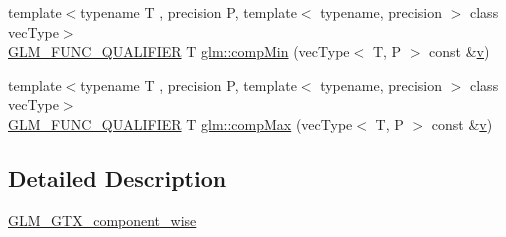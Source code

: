 \begin{DoxyCompactItemize}
\item 
{\footnotesize template$<$typename T , precision P, template$<$ typename, precision $>$ class vec\+Type$>$ }\\\mbox{\hyperlink{setup_8hpp_a33fdea6f91c5f834105f7415e2a64407}{G\+L\+M\+\_\+\+F\+U\+N\+C\+\_\+\+Q\+U\+A\+L\+I\+F\+I\+ER}} T \mbox{\hyperlink{namespaceglm_a1577bdcf5f8b76fb66296ac53fe77fa8}{glm\+::comp\+Min}} (vec\+Type$<$ T, P $>$ const \&\mbox{\hyperlink{glad_8h_a14cfbe2fc2234f5504618905b69d1e06}{v}})
\item 
{\footnotesize template$<$typename T , precision P, template$<$ typename, precision $>$ class vec\+Type$>$ }\\\mbox{\hyperlink{setup_8hpp_a33fdea6f91c5f834105f7415e2a64407}{G\+L\+M\+\_\+\+F\+U\+N\+C\+\_\+\+Q\+U\+A\+L\+I\+F\+I\+ER}} T \mbox{\hyperlink{namespaceglm_a6d3b715875f887b364a34a7529c8fc1b}{glm\+::comp\+Max}} (vec\+Type$<$ T, P $>$ const \&\mbox{\hyperlink{glad_8h_a14cfbe2fc2234f5504618905b69d1e06}{v}})
\end{DoxyCompactItemize}


\subsection{Detailed Description}
\mbox{\hyperlink{group__gtx__component__wise}{G\+L\+M\+\_\+\+G\+T\+X\+\_\+component\+\_\+wise}} 